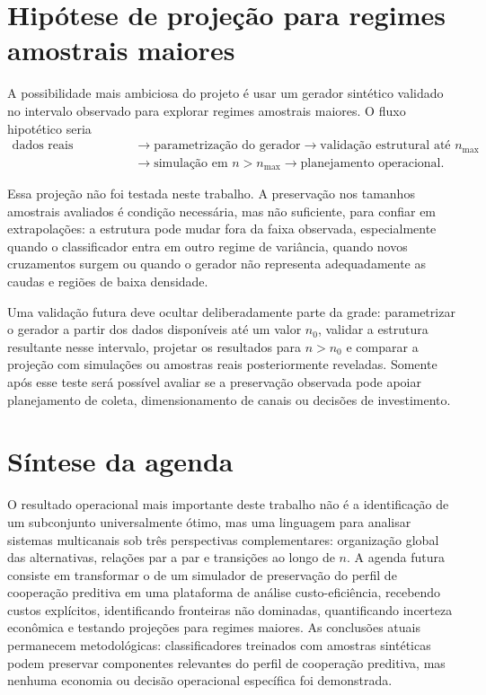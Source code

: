 \section{Hipótese de projeção para regimes amostrais maiores}

A possibilidade mais ambiciosa do projeto é usar um gerador sintético validado no intervalo observado para explorar regimes amostrais maiores. O fluxo hipotético seria
\[
\begin{aligned}
\text{dados reais disponíveis}
&\longrightarrow \text{parametrização do gerador}
\longrightarrow \text{validação estrutural até }n_{\max}\\
&\longrightarrow \text{simulação em }n>n_{\max}
\longrightarrow \text{planejamento operacional}.
\end{aligned}
\]

Essa projeção não foi testada neste trabalho. A preservação nos tamanhos amostrais avaliados é condição necessária, mas não suficiente, para confiar em extrapolações: a estrutura pode mudar fora da faixa observada, especialmente quando o classificador entra em outro regime de variância, quando novos cruzamentos surgem ou quando o gerador não representa adequadamente as caudas e regiões de baixa densidade.

Uma validação futura deve ocultar deliberadamente parte da grade: parametrizar o gerador a partir dos dados disponíveis até um valor $n_0$, validar a estrutura resultante nesse intervalo, projetar os resultados para $n>n_0$ e comparar a projeção com simulações ou amostras reais posteriormente reveladas. Somente após esse teste será possível avaliar se a preservação observada pode apoiar planejamento de coleta, dimensionamento de canais ou decisões de investimento.

\section{Síntese da agenda}

O resultado operacional mais importante deste trabalho não é a identificação de um subconjunto universalmente ótimo, mas uma linguagem para analisar sistemas multicanais sob três perspectivas complementares: organização global das alternativas, relações par a par e transições ao longo de $n$. A agenda futura consiste em transformar o \CoInfoSim{} de um simulador de preservação do perfil de cooperação preditiva em uma plataforma de análise custo-eficiência, recebendo custos explícitos, identificando fronteiras não dominadas, quantificando incerteza econômica e testando projeções para regimes maiores. As conclusões atuais permanecem metodológicas: classificadores treinados com amostras sintéticas podem preservar componentes relevantes do perfil de cooperação preditiva, mas nenhuma economia ou decisão operacional específica foi demonstrada.
